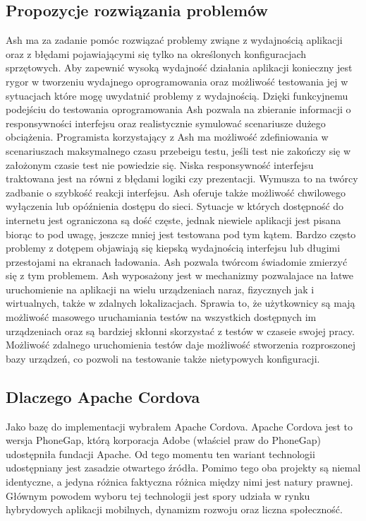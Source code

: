 \documentclass[a4paper]{article}
\begin{document}
\subsection{Propozycje rozwiązania problemów}
Ash ma za zadanie pomóc rozwiązać problemy zwiąne z wydajnością aplikacji oraz z
błędami pojawiającymi się tylko na określonych konfiguracjach sprzętowych. Aby
zapewnić wysoką wydajność działania aplikacji konieczny jest rygor w tworzeniu
wydajnego oprogramowania oraz możliwość testowania jej w sytuacjach które mogę
uwydatnić problemy z wydajnością. Dzięki funkcyjnemu podejściu do testowania
oprogramowania Ash pozwala na zbieranie informacji o responsywności interfejsu
oraz realistycznie symulować scenariusze dużego obciążenia. Programista
korzystający z Ash ma możliwość zdefiniowania w scenariuszach maksymalnego
czasu przebeigu testu, jeśli test nie zakończy się w założonym czasie test nie
powiedzie się. Niska responsywność interfejsu traktowana jest na równi z błędami
logiki czy prezentacji. Wymusza to na twórcy zadbanie o szybkość reakcji interfejsu.
Ash oferuje także możliwość chwilowego wyłączenia lub opóźnienia dostępu do
sieci. Sytuacje w których dostępność do internetu jest ograniczona są dość częste,
jednak niewiele aplikacji jest pisana biorąc to pod uwagę, jeszcze mniej jest
testowana pod tym kątem. Bardzo często problemy z dotępem objawiają się kiepską
wydajnością interfejsu lub długimi przestojami na ekranach ładowania. Ash pozwala
twórcom świadomie zmierzyć się z tym problemem. Ash wyposażony jest w
mechanizmy pozwalajace na łatwe uruchomienie na aplikacji na wielu urządzeniach
naraz, fizycznych jak i wirtualnych, także w zdalnych lokalizacjach. Sprawia to, że
użytkownicy są mają możliwość masowego uruchamiania testów na wszystkich
dostępnych im urządzeniach oraz są bardziej skłonni skorzystać z testów w czaseie
swojej pracy. Możliwość zdalnego uruchomienia testów daje możliwość stworzenia
rozproszonej bazy urządzeń, co pozwoli na testowanie także nietypowych
konfiguracji.

\subsection{Dlaczego Apache Cordova}
Jako bazę do implementacji wybrałem Apache Cordova. Apache Cordova jest to
wersja PhoneGap, którą korporacja Adobe (właściel praw do PhoneGap) udostępniła
fundacji Apache. Od tego momentu ten wariant technologii udostępniany jest
zasadzie otwartego źródła. Pomimo tego oba projekty są niemal identyczne, a jedyna
różnica faktyczna różnica między nimi jest natury prawnej. Głównym powodem
wyboru tej technologii jest spory udziała w rynku hybrydowych aplikacji mobilnych,
dynamizm rozwoju oraz liczna społeczność.
\end{document}
